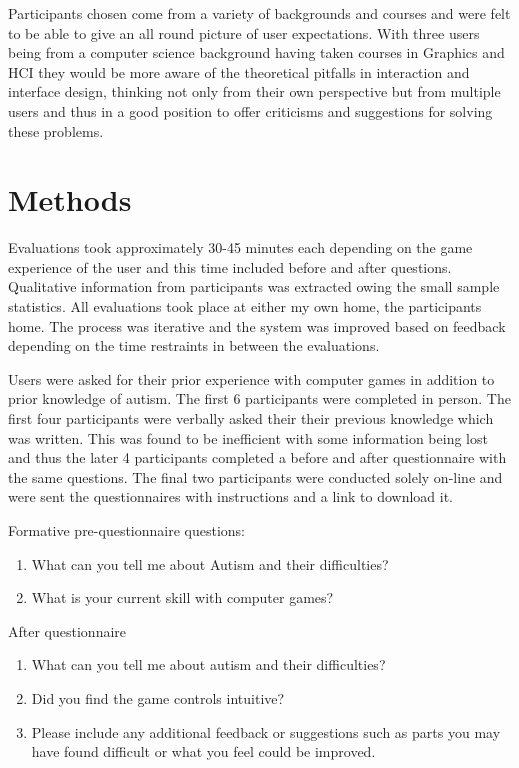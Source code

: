 \documentclass[11pt]{report}
\begin{document}
Participants chosen come from a variety of backgrounds and courses and were felt to be able to give an all round picture of user expectations. With three users being from a computer science background having taken courses in Graphics and HCI they would be more aware of the theoretical pitfalls in interaction and interface design, thinking not only from their own perspective but from multiple users and thus in a good position to offer criticisms and suggestions for solving these problems.

\section{Methods}

Evaluations took approximately 30-45 minutes each depending on the game experience of the user and this time included before and after questions. Qualitative information from participants was extracted owing the small sample statistics. All evaluations took place at either my own home, the participants home. The process was iterative and the system was improved based on feedback depending on the time restraints in between the evaluations.  

Users were asked for their prior experience with computer games in addition to prior knowledge of autism. The first 6 participants were completed in person. The first four participants were verbally asked their their previous knowledge which was written. This was found to be inefficient with some information being lost and thus the later 4 participants completed a before and after questionnaire with the same questions. The final two participants were conducted solely on-line and were sent the questionnaires with instructions and a link to download it. 

Formative pre-questionnaire questions:
\begin{enumerate}
\item What can you tell me about Autism and their difficulties?
\item What is your current skill with computer games?
\end{enumerate}

After questionnaire 
\begin{enumerate}
\item What can you tell me about autism and their difficulties?
\item Did you find the game controls intuitive?
\item Please include any additional feedback or suggestions such as parts you may have found difficult or what you feel could be improved.
\end{enumerate}
\end{document}
